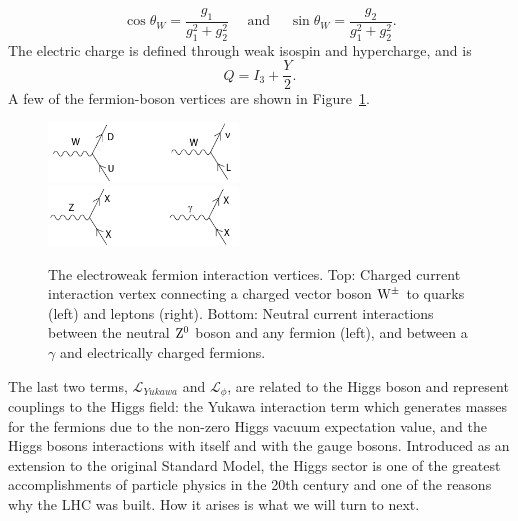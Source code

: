 \begin{equation}
     \cos \theta_W = \frac{g_1}{g^2_1+g^2_2}  \quad \textrm{ and } \quad \sin \theta_W = \frac{g_2}{g^2_1+g^2_2}.        
\end{equation}
The electric charge is defined through weak isospin and hypercharge, and is
\begin{equation}
  Q = I_3 + \frac{Y}{2}.
  \end{equation}
A few of the fermion-boson vertices are shown in Figure~\ref{fig:theory:weakfermionint}.\par
  \begin{figure}[h!]
  \centering
  \includegraphics[width=0.45\textwidth]{figures/theory/ew_ch.png}\\
  \includegraphics[width=0.45\textwidth]{figures/theory/ew_neu.png}
  \caption{The electroweak fermion interaction vertices. Top: Charged current interaction vertex connecting a charged vector boson $\mathrm{W}^{\pm}$ to quarks (left) and leptons (right). Bottom: Neutral current interactions between the neutral $\mathrm{Z}^0$ boson and any fermion (left), and between a $\gamma$ and electrically charged fermions.}
  \label{fig:theory:weakfermionint}
  \end{figure}
The last two terms, $\mathcal{L}_{Yukawa}$ and $\mathcal{L}_{\phi}$, are related to the Higgs boson and represent couplings to the Higgs field: the Yukawa interaction term which generates masses for the fermions due to the non-zero Higgs vacuum expectation value, and the Higgs bosons interactions with itself and with the gauge bosons. Introduced as an extension to the original Standard Model, the Higgs sector is one of the greatest accomplishments of particle physics in the 20th century and one of the reasons why the LHC was built. How it arises is what we will turn to next.

